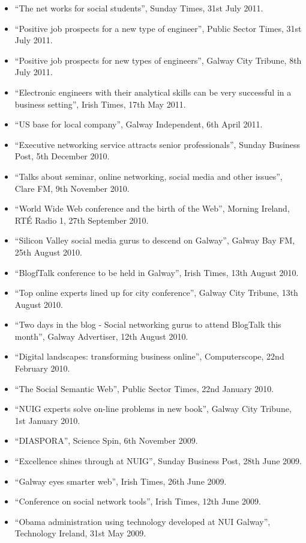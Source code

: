 \documentclass[10pt,a4paper]{res} %
\begin{document}
\begin{resume}
{\begin{itemize}
\item ``The net works for social students'', Sunday Times, 31st July 2011.
\item ``Positive job prospects for a new type of engineer'', Public Sector Times, 31st July 2011.
\item ``Positive job prospects for new types of engineers'', Galway City Tribune, 8th July 2011.
\item ``Electronic engineers with their analytical skills can be very successful in a business setting'', Irish Times, 17th May 2011.
\item ``US base for local company'', Galway Independent, 6th April 2011.
\item ``Executive networking service attracts senior professionals'', Sunday Business Post, 5th December 2010.
\item ``Talks about seminar, online networking, social media and other issues'', Clare FM, 9th November 2010.
\item ``World Wide Web conference and the birth of the Web'', Morning Ireland, RT\'{E} Radio 1, 27th September 2010.
\item ``Silicon Valley social media gurus to descend on Galway'', Galway Bay FM, 25th August 2010.
\item ``BlogfTalk conference to be held in Galway'', Irish Times, 13th August 2010.
\item ``Top online experts lined up for city conference'', Galway City Tribune, 13th August 2010.
\item ``Two days in the blog - Social networking gurus to attend BlogTalk this month'', Galway Advertiser, 12th August 2010.
\item ``Digital landscapes: transforming business online'', Computerscope, 22nd February 2010.
\item ``The Social Semantic Web'', Public Sector Times, 22nd January 2010.
\item ``NUIG experts solve on-line problems in new book'', Galway City Tribune, 1st January 2010.
\item ``DIASPORA'', Science Spin, 6th November 2009.
\item ``Excellence shines through at NUIG'', Sunday Business Post, 28th June 2009.
\item ``Galway eyes smarter web'', Irish Times, 26th June 2009.
\item ``Conference on social network tools'', Irish Times, 12th June 2009.
\item ``Obama administration using technology developed at NUI Galway'', Technology Ireland, 31st May 2009.

\end{itemize}}
\end{resume}
\end{document}
